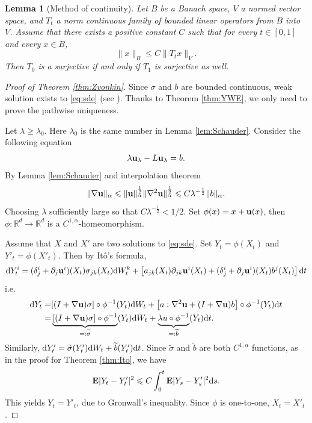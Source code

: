 \documentclass[twoside, 12pt]{book}
\numberwithin{equation}{chapter}
\newtheorem{lemma}[theorem]{Lemma}
\def\mR{{\mathbb R}}
\def\bE{{\mathbf E}}
\def\l{\left}
\def\r{\right}
\def\geq{\geqslant}
\def\leq{\leqslant}
\def\p{\partial}
\def\d{\text{\rm{d}}}
\begin{document}
	\begin{lemma}[Method of continuity]\label{lem:continum}
		Let $B$ be a Banach space, $V$ a normed vector space, and 
		$T_t$ a norm continuous family of bounded linear operators from $B$ into $V$. Assume that there exists a positive constant $C$ such that for every $t\in [0,1]$ and every $x\in B$, 
		\[
		\|x\|_{B} \leq C \|T_t x\|_{V}. 
		\]
		Then $T_0$ is a surjective if and only if  $T_1$ is surjective as well.
	\end{lemma}
	
	\begin{proof}[Proof of Theorem \ref{thm:Zvonkin}] 
		Since $\sigma$ and $b$ are bounded continuous, weak solution exists to \eqref{eq:sde} (see \cite{Huang}). Thanks to Theorem \ref{thm:YWE}, we only need to prove the pathwise uniqueness. 
		
		Let $\lambda\geq \lambda_0$. Here $\lambda_0$ is the same number in Lemma \ref{lem:Schauder}. Consider the following equation 
		\[
		\lambda {\bf u}_\lambda - L {\bf u}_\lambda = b. 
		\]
		By Lemma \ref{lem:Schauder} and interpolation theorem 
		\[
		\|\nabla {\bf u} \|_{\alpha} \leq \|{\bf u}\|_{\alpha}^{\frac{1}{2}} \|\nabla^2 {\bf u}\|_{\alpha}^{\frac{1}{2}} \leq   C \lambda^{-\frac{1}{2}} \|b\|_{\alpha}. 
		\]
		Choosing $\lambda$ sufficiently large so that $C \lambda^{-\frac{1}{2}} <1/2$.  Set $\phi (x) = x + {\bf u}(x)$, then $\phi: \mR^d \to \mR^d$ is a $C^{1,\alpha}$-homeomorphism. 
		
		Assume that $X$ and $X'$ are two solutions to \eqref{eq:sde}. Set $Y_t=\phi(X_t)$ and $Y'_t=\phi(X'_t)$. Then by It\^o's formula, 
		\begin{equation*}
			\d Y_t^i = (\delta^i_j+\p_j {\bf u}^i)(X_t) \sigma_{jk} (X_t) \d W_t^k + \l[  a_{jk}(X_t)\p_{jk}{\bf u}^i (X_t)+ (\delta^i_j+\p_j {\bf u}^i)(X_t) b^j (X_t) \r]  \d t
		\end{equation*}
		i.e. 
		\begin{equation*}
			\begin{aligned}
				\d Y_t=& [(I+\nabla {\bf u})\sigma ]\circ \phi^{-1}(Y_t) \d W_t + \l[ a:\nabla^2 {\bf u}+ (I+\nabla {\bf u})b\r] \circ \phi^{-1}(Y_t)   \d t \\
				=&  \underbrace{[(I+\nabla {\bf u})\sigma ]\circ \phi^{-1} }_{=:\widetilde{\sigma}}(Y_t) \d W_t  + \underbrace{\lambda u \circ\phi^{-1}}_{=:\widetilde{b}} (Y_t) \d t. 
			\end{aligned}
		\end{equation*}
		Similarly, $\d Y'_t = \widetilde{\sigma}(Y'_t)\d W_t + \widetilde{b}(Y'_t) \d t$. Since $\widetilde{\sigma}$ and $\widetilde{b}$ are both $C^{1,\alpha}$ functions, as in the proof for Theorem \ref{thm:Ito}, we have 
		\[
		\bE |Y_t-Y'_t|^2 \leq C \int_0^t \bE |Y_s-Y'_s|^2 \d s.  
		\]
		This yields $Y_t=Y'_t$, due to Gronwall's inequality. Since $\phi$ is one-to-one, $X_t=X'_t$. 
	\end{proof}
	
\end{document}
